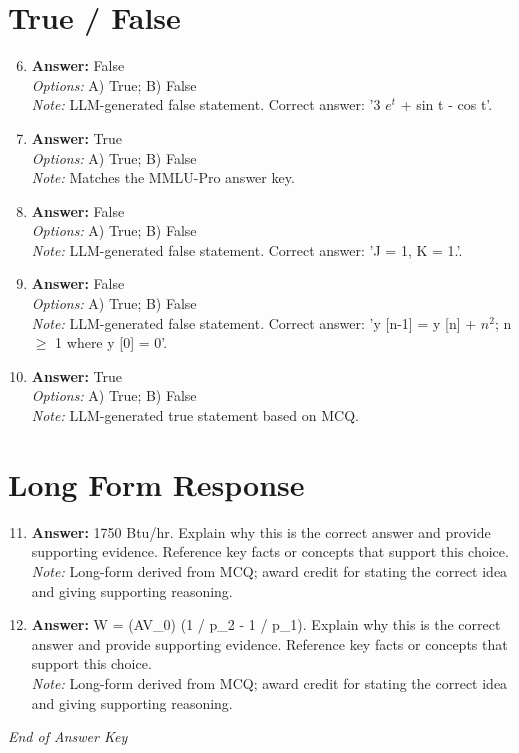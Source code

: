 \documentclass[12pt]{article}
\begin{document}
\section*{True / False}
\begin{enumerate}[label=\arabic*.]
\setcounter{enumi}{5}
\item \textbf{Answer:} False
\\ \textit{Options:} A) True; B) False
\\ \textit{Note:} LLM-generated false statement. Correct answer: '3 $e^t$ + sin t - cos t'.
\item \textbf{Answer:} True
\\ \textit{Options:} A) True; B) False
\\ \textit{Note:} Matches the MMLU-Pro answer key.
\item \textbf{Answer:} False
\\ \textit{Options:} A) True; B) False
\\ \textit{Note:} LLM-generated false statement. Correct answer: 'J = 1, K = 1.'.
\item \textbf{Answer:} False
\\ \textit{Options:} A) True; B) False
\\ \textit{Note:} LLM-generated false statement. Correct answer: 'y [n-1] = y [n] + $n^2$; n \ensuremath{\geq} 1 where y [0] = 0'.
\item \textbf{Answer:} True
\\ \textit{Options:} A) True; B) False
\\ \textit{Note:} LLM-generated true statement based on MCQ.
\end{enumerate}

\section*{Long Form Response}
\begin{enumerate}[label=\arabic*.]
\setcounter{enumi}{10}
\item \textbf{Answer:} 1750 Btu/hr. Explain why this is the correct answer and provide supporting evidence. Reference key facts or concepts that support this choice.
\\ \textit{Note:} Long-form derived from MCQ; award credit for stating the correct idea and giving supporting reasoning.
\item \textbf{Answer:} W = (AV\_0) (1 / p\_2 - 1 / p\_1). Explain why this is the correct answer and provide supporting evidence. Reference key facts or concepts that support this choice.
\\ \textit{Note:} Long-form derived from MCQ; award credit for stating the correct idea and giving supporting reasoning.
\end{enumerate}

\vfill
\noindent\textit{End of Answer Key}
\end{document}
